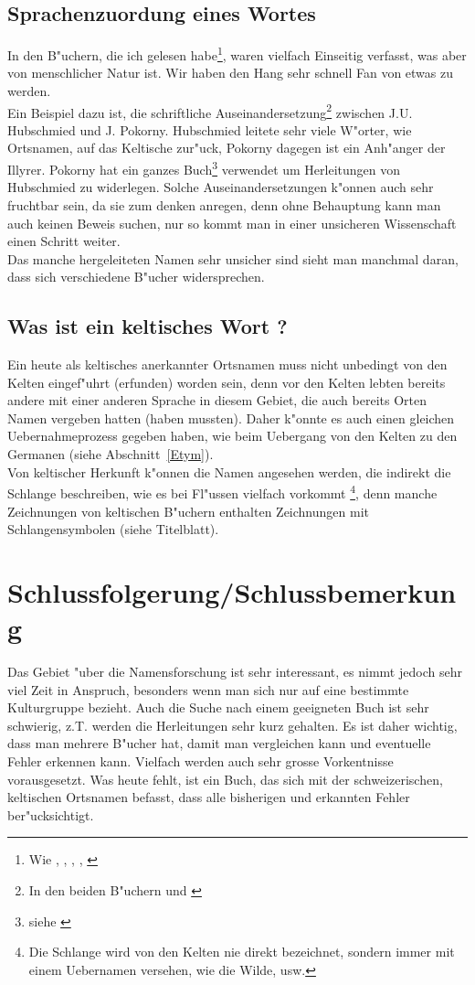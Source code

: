 \documentclass[10pt]{article}
\begin{document}
\subsection{Sprachenzuordung eines Wortes}
In den B"uchern, die ich gelesen habe\footnote{Wie \cite{IDG:KRAHE},
\cite{VOX:3}, \cite{VOX:10}, \cite{ORT:KLAEUI}, \cite{KELT:HOPFNER}},
waren vielfach Einseitig verfasst, was aber von menschlicher Natur ist.
Wir haben den Hang sehr schnell Fan von etwas zu werden.\\
Ein Beispiel dazu ist, die schriftliche Auseinandersetzung\footnote{In den
beiden B"uchern \cite{VOX:3} und \cite{VOX:10}} zwischen
J.U. Hubschmied und J. Pokorny. Hubschmied leitete sehr viele
W"orter, wie Ortsnamen, auf das Keltische zur"uck, Pokorny dagegen ist ein
Anh"anger der Illyrer. Pokorny hat ein ganzes Buch\footnote{siehe
\cite{VOX:10}} verwendet um Herleitungen von Hubschmied zu
widerlegen. Solche Auseinandersetzungen k"onnen auch sehr fruchtbar sein,
da sie zum denken anregen, denn ohne Behauptung kann man auch keinen 
Beweis suchen, nur so kommt man in einer unsicheren Wissenschaft einen
Schritt weiter.\\
Das manche hergeleiteten Namen sehr unsicher sind sieht man manchmal daran,
dass sich verschiedene B"ucher widersprechen.

\subsection{Was ist ein keltisches Wort ?}
Ein heute als keltisches anerkannter Ortsnamen muss nicht unbedingt von
den Kelten eingef"uhrt (erfunden) worden sein, denn vor den Kelten lebten
bereits andere mit einer anderen Sprache in diesem Gebiet, die auch
bereits Orten Namen vergeben hatten (haben mussten). Daher k"onnte es auch
einen gleichen Uebernahmeprozess gegeben haben, wie beim Uebergang von
den Kelten zu den Germanen (siehe Abschnitt~\ref{Etym}).\\
Von keltischer Herkunft k"onnen die Namen angesehen werden, die
indirekt die Schlange beschreiben, wie es bei Fl"ussen vielfach vorkommt
\footnote{Die Schlange wird von den Kelten nie direkt bezeichnet, sondern
immer mit einem Uebernamen versehen, wie die Wilde, usw.}, denn manche Zeichnungen
von keltischen B"uchern enthalten Zeichnungen mit Schlangensymbolen (siehe
Titelblatt).

\section*{Schlussfolgerung/Schlussbemerkung}
Das Gebiet "uber die Namensforschung ist sehr interessant, es nimmt jedoch
sehr viel Zeit in Anspruch, besonders wenn man sich nur auf eine bestimmte
Kulturgruppe bezieht. Auch die Suche nach einem geeigneten Buch ist sehr
schwierig, z.T. werden die Herleitungen sehr kurz gehalten.
Es ist daher wichtig, dass man mehrere B"ucher hat, damit man vergleichen
kann und eventuelle Fehler erkennen kann. Vielfach werden auch sehr grosse
Vorkentnisse vorausgesetzt. Was heute fehlt, ist ein Buch, das sich mit der
schweizerischen, keltischen Ortsnamen befasst, dass alle bisherigen und
erkannten Fehler ber"ucksichtigt.


\newpage

 

\end{document}
